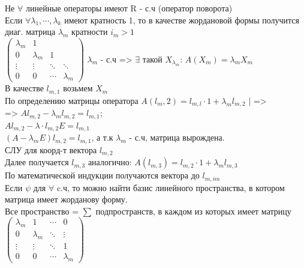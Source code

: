 \documentclass[12pt]{article}
\begin{document}
    Не \(\forall\) линейные операторы имеют R - с.ч (оператор поворота)\\
    Если  \(\forall \lambda_1,\cdots,\lambda_k\) имеют кратность 1, то в качестве жордановой формы получится диаг. матрица \(\lambda_m\) кратности \(i_m > 1\) \\
    $
        \begin{pmatrix}
            \lambda_m & 1                              \\
            0         & \lambda_m & 1                  \\
            \vdots    & \vdots    & \ddots & \ddots    \\
            0         & 0         & \cdots & \lambda_m
        \end{pmatrix}$ $\lambda_m$ - с.ч => $\exists$ такой $X_{\lambda_m}$: $A(X_m) = \lambda_mX_m$\\
    В качестве $l_{m,1}$ возьмем $X_m$\\
    По определению матрицы оператора $A(l_m, 2) = l_{m, l} \cdot 1 + \lambda_ml_{m, 2}$ | =>\\
    => $Al_{m, 2} - \lambda_ml_{m, 2} = l_{m, 1}$;\\
    $Al_{m, 2} - \lambda \cdot l_{m, 2}E = l_{m, 1}$\\
    $(A - \lambda_mE)l_{m, 2} = l_{m, 1}$, а т.к $\lambda_m$ - с.ч, матрица вырождена. \\
    СЛУ для коорд-т вектора $l_{m, 2}$ \\
    Далее получается $l_{m, 3}$ аналогично: $A(l_{m, 3}) = l_{m, 2} \cdot 1 + \lambda_ml_{m, 3}$\\
    По математической индукции получаются вектора до $l_{m, im}$\\
    Если $\psi$ для $\forall$ c.ч, то можно найти базис линейного пространства, в котором матрица имеет жорданову форму.\\
    Все пространство = $\sum$ подпространств, в каждом из которых имеет матрицу
    $
        \begin{pmatrix}
            \lambda_m & 1         & \cdots & 0         \\
            0         & \lambda_m & \ddots & \vdots    \\
            \vdots    & \vdots    & \ddots & 1         \\
            0         & 0         & \cdots & \lambda_m
        \end{pmatrix}
    $
\end{document}

